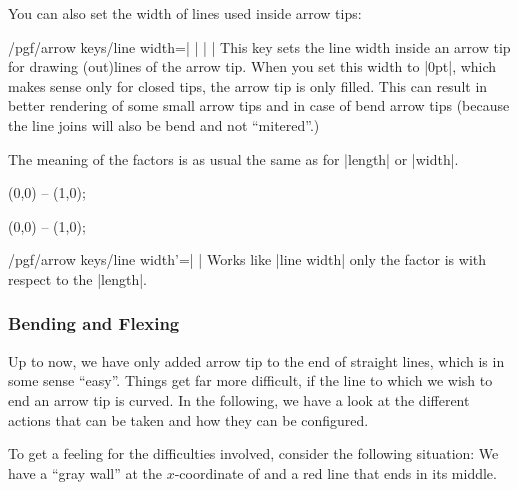 You can also set the width of lines used inside arrow tips:

\begin{key}{/pgf/arrow keys/line width=| |%
        | |}
    This key sets the line width inside an arrow tip for drawing (out)lines of
    the arrow tip. When you set this width to |0pt|, which makes sense only for
    closed tips, the arrow tip is only filled. This can result in better
    rendering of some small arrow tips and in case of bend arrow tips (because
    the line joins will also be bend and not ``mitered''.)

    The meaning of the factors is as usual the same as for |length| or |width|.
\begin{codeexample}[width=2cm]
\tikz \draw [arrows = {-Latex[line width=0.1pt, fill=white, length=10pt]}] (0,0) -- (1,0);
\end{codeexample}
\begin{codeexample}[width=2cm]
\tikz \draw [arrows = {-Latex[line width=1pt, fill=white, length=10pt]}] (0,0) -- (1,0);
\end{codeexample}
\end{key}

\begin{key}{/pgf/arrow keys/line width'=| |}
    Works like |line width| only the factor is with respect to the |length|.
\end{key}


\subsubsection{Bending and Flexing}
\label{section-arrow-flex}

Up to now, we have only added arrow tip to the end of straight lines, which is
in some sense ``easy''. Things get far more difficult, if the line to which we
wish to end an arrow tip is curved. In the following, we have a look at the
different actions that can be taken and how they can be configured.

To get a feeling for the difficulties involved, consider the following
situation: We have a ``gray wall'' at the $x$-coordinate of and a red line that
ends in its middle.
%
\begin{codeexample}[preamble={\usetikzlibrary{patterns}}]
\def\wall{ \fill     [fill=black!50]  (1,-.5) rectangle (2,.5);
           \pattern  [pattern=bricks] (1,-.5) rectangle (2,.5);
           \draw     [line width=1pt]  (1cm+.5pt,-.5) -- ++(0,1); }
\end{codeexample}

